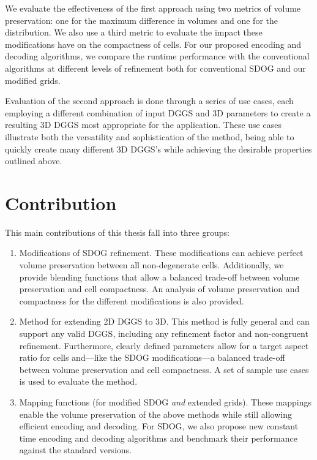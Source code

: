 We evaluate the effectiveness of the first approach using two metrics of volume preservation: one for the maximum difference in volumes and one for the distribution.
We also use a third metric to evaluate the impact these modifications have on the compactness of cells.
For our proposed encoding and decoding algorithms, we compare the runtime performance with the conventional algorithms at different levels of refinement both for conventional SDOG and our modified grids.


Evaluation of the second approach is done through a series of use cases, each employing a different combination of input DGGS and 3D parameters to create a resulting 3D DGGS most appropriate for the application.
These use cases illustrate both the versatility and sophistication of the method, being able to quickly create many different 3D DGGS's while achieving the desirable properties outlined above.


\section{Contribution}
This main contributions of this thesis fall into three groups:

\begin{enumerate}
	\item Modifications of SDOG refinement.
	These modifications can achieve perfect volume preservation between all non-degenerate cells.
	Additionally, we provide blending functions that allow a balanced trade-off between volume preservation and cell compactness.
	An analysis of volume preservation and compactness for the different modifications is also provided.
	
	\item Method for extending 2D DGGS to 3D.
	This method is fully general and can support any valid DGGS, including any refinement factor and non-congruent refinement.
	Furthermore, clearly defined parameters allow for a target aspect ratio for cells and---like the SDOG modifications---a balanced trade-off between volume preservation and cell compactness.
	A set of sample use cases is used to evaluate the method.
	
	\item Mapping functions (for modified SDOG \textit{and} extended grids).
	These mappings enable the volume preservation of the above methods while still allowing efficient encoding and decoding.
	For SDOG, we also propose new constant time encoding and decoding algorithms and benchmark their performance against the standard versions.
\end{enumerate}

